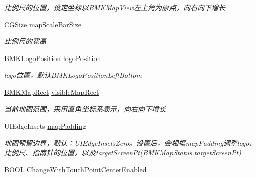 \begin{DoxyCompactItemize}
\begin{DoxyCompactList}\small\item\em 比例尺的位置，设定坐标以\+B\+M\+K\+Map\+View左上角为原点，向右向下增长 \end{DoxyCompactList}\item 
\hypertarget{interface_b_m_k_map_view_a07d445e2f05ffb22b1adf8171c73e048}{}C\+G\+Size \hyperlink{interface_b_m_k_map_view_a07d445e2f05ffb22b1adf8171c73e048}{map\+Scale\+Bar\+Size}\label{interface_b_m_k_map_view_a07d445e2f05ffb22b1adf8171c73e048}

\begin{DoxyCompactList}\small\item\em 比例尺的宽高 \end{DoxyCompactList}\item 
\hypertarget{interface_b_m_k_map_view_a38d66b04c78c87a95bf16b6a94858438}{}B\+M\+K\+Logo\+Position \hyperlink{interface_b_m_k_map_view_a38d66b04c78c87a95bf16b6a94858438}{logo\+Position}\label{interface_b_m_k_map_view_a38d66b04c78c87a95bf16b6a94858438}

\begin{DoxyCompactList}\small\item\em logo位置，默认\+B\+M\+K\+Logo\+Position\+Left\+Bottom \end{DoxyCompactList}\item 
\hypertarget{interface_b_m_k_map_view_a35576ab39592ef50d1190c2b672c0923}{}\hyperlink{struct_b_m_k_map_rect}{B\+M\+K\+Map\+Rect} \hyperlink{interface_b_m_k_map_view_a35576ab39592ef50d1190c2b672c0923}{visible\+Map\+Rect}\label{interface_b_m_k_map_view_a35576ab39592ef50d1190c2b672c0923}

\begin{DoxyCompactList}\small\item\em 当前地图范围，采用直角坐标系表示，向右向下增长 \end{DoxyCompactList}\item 
\hypertarget{interface_b_m_k_map_view_a04e5562fe721155f4412a7fdd9ab7a80}{}U\+I\+Edge\+Insets \hyperlink{interface_b_m_k_map_view_a04e5562fe721155f4412a7fdd9ab7a80}{map\+Padding}\label{interface_b_m_k_map_view_a04e5562fe721155f4412a7fdd9ab7a80}

\begin{DoxyCompactList}\small\item\em 地图预留边界，默认：\+U\+I\+Edge\+Insets\+Zero。设置后，会根据map\+Padding调整logo、比例尺、指南针的位置，以及target\+Screen\+Pt(\hyperlink{interface_b_m_k_map_status_a902555f3b28504a2217443c496edc491}{B\+M\+K\+Map\+Status.\+target\+Screen\+Pt}) \end{DoxyCompactList}\item 
\hypertarget{interface_b_m_k_map_view_aa1868ea167edc68fe4b15ad982968ade}{}B\+O\+O\+L \hyperlink{interface_b_m_k_map_view_aa1868ea167edc68fe4b15ad982968ade}{Change\+With\+Touch\+Point\+Center\+Enabled}\label{interface_b_m_k_map_view_aa1868ea167edc68fe4b15ad982968ade}


\end{DoxyCompactItemize}
